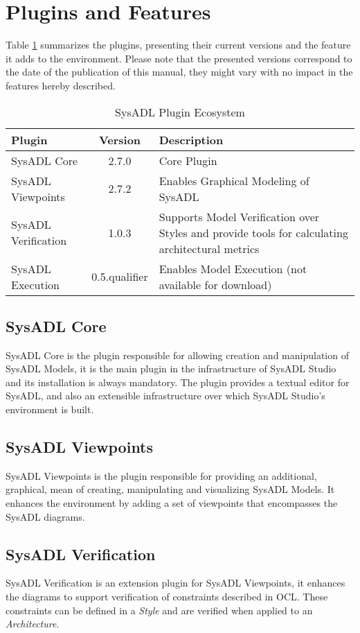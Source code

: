 \section{Plugins and Features}
Table \ref{overview:plugins} summarizes the plugins, presenting their current versions and the feature it adds to the environment. Please note that the presented versions correspond to the date of the publication of this manual, they might vary with no impact in the features hereby described.
\begin{table}
	\centering
	\begin{tabular}{l | c | p{5.9cm}}
		\hline
		\textbf{Plugin} & \textbf{Version} & \textbf{Description} \\\hline
		SysADL Core & 2.7.0 & Core Plugin\\\hline
		SysADL Viewpoints & 2.7.2 & Enables Graphical Modeling of SysADL\\\hline
		SysADL Verification & 1.0.3 & Supports Model Verification over Styles and provide tools for calculating architectural metrics\\ \hline
		SysADL Execution & 0.5.qualifier & Enables Model Execution (not available for download)\\ \hline
	\end{tabular}
	\caption{\label{overview:plugins}SysADL Plugin Ecosystem}
\end{table}

\subsection{SysADL Core}
SysADL Core is the plugin responsible for allowing creation and manipulation of SysADL Models, it is the main plugin in the infrastructure of SysADL Studio and its installation is always mandatory. The plugin provides a textual editor for SysADL, and also an extensible infrastructure over which SysADL Studio's environment is built.
\subsection{SysADL Viewpoints}
SysADL Viewpoints is the plugin responsible for providing an additional, graphical, mean of creating, manipulating and visualizing SysADL Models. It enhances the environment by adding a set of viewpoints that encompasses the SysADL diagrams.

\subsection{SysADL Verification}
SysADL Verification is an extension plugin for SysADL Viewpoints, it enhances the diagrams to support verification of constraints described in OCL. These constraints can be defined in a \textit{Style} and are verified when applied to an \textit{Architecture}.

